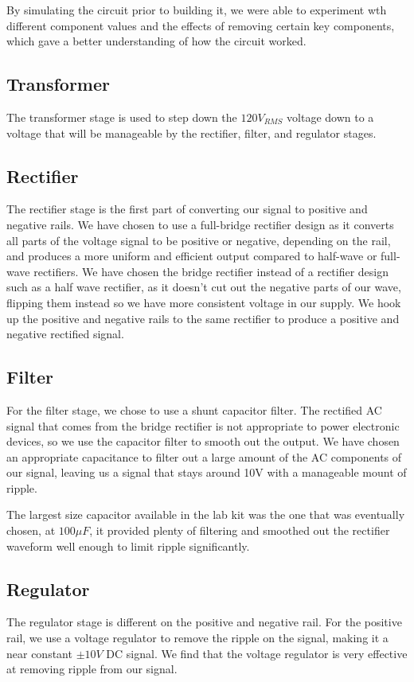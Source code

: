 \documentclass[12pt]{article}
\begin{document}
By simulating the circuit prior to building it, we were able to experiment wth different
component values and the effects of removing certain key components, which gave a better
understanding of how the circuit worked.

\subsection{Transformer}
The transformer stage is used to step down the $120 V_{RMS}$ voltage down to a voltage that will be manageable by the rectifier, filter, and regulator stages.

\subsection{Rectifier}
The rectifier stage is the first part of converting our signal to positive and negative rails. We have chosen to use a full-bridge rectifier design as it converts all parts of the voltage signal 
to be positive or negative, depending on the rail, and produces a more uniform and efficient output compared to half-wave or full-wave rectifiers. We have chosen the bridge rectifier instead of a rectifier design such as a half wave rectifier, as it doesn't cut out 
the negative parts of our wave, flipping them instead so we have more consistent voltage in our supply. We hook up the positive and negative rails to the same rectifier to produce a 
positive and negative rectified signal.

\subsection{Filter}
For the filter stage, we chose to use a shunt capacitor filter. The rectified AC signal that comes from the bridge rectifier is not appropriate to power electronic devices, so 
we use the capacitor filter to smooth out the output. We have chosen an appropriate capacitance to filter out a large amount of the AC components of our signal, leaving us a 
signal that stays around 10V with a manageable mount of ripple.

The largest size capacitor available in the lab kit was the one that was eventually chosen,
at $100 \mu F$, it provided plenty of filtering and smoothed out the rectifier waveform
well enough to limit ripple significantly.

\subsection{Regulator}
The regulator stage is different on the positive and negative rail. For the positive rail, we use a voltage regulator to remove the ripple on the signal, making it a 
near constant $\pm10 V$ DC signal. We find that the voltage regulator is very effective at removing ripple from our signal.
\end{document}
